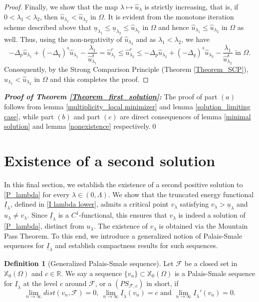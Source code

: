 \documentclass[reqno,oneside]{amsart}
\theoremstyle{definition}
\newtheorem{definition}[theorem]{Definition}
\theoremstyle{remark}
\numberwithin{equation}{section}
\newcommand{\Om} {\Omega}
\newcommand{\sr}{\mathbb{R}}
\newcommand{\p}{\Delta_p}
\newcommand{\qs}{(-\Delta_q)^s}
\newcommand{\rar}{\rightarrow}
\newcommand{\xo}{\mathbb{X}_0}
\newcommand{\ul}{\underline{u}}
\newcommand{\ti}{\underline{I}_{\la}}
\newcommand{\il}{\underline{I}}
\newcommand{\la} {\lambda}
\begin{document}
\begin{proof}
    Finally, we show that the map $\la \mapsto \hat{u}_{\la}$ is strictly increasing, that is, if $0<\la_1 < \la_2$, then $\hat{u}_{\la_1} < \hat{u}_{\la_2}$ in $\Om$. It is evident from the monotone iteration scheme described above that $\ul_{\la_1} \leq \ul_{\la_2} \leq \hat{u}_{\la_2}$ in $\Om$ and hence $\hat{u}_{\la_1} \leq \hat{u}_{\la_2}$ in $\Om$ as well. Thus, using the non-negativity of $\hat{u}_{\la_2}$ and as $\la_1 < \la_2$, we have
    \[-\p \hat{u}_{\la_1} + \qs \hat{u}_{\la_1} - \frac{\la_1}{\hat{u}_{\la_1}^{\delta}} = \hat{u}_{\la_1}^r \leq \hat{u}_{\la_2}^r \leq -\p \hat{u}_{\la_2} + \qs \hat{u}_{\la_2} - \frac{\la_1}{\hat{u}_{\la_2}^{\delta}} \text{ in } \Om.\]
    Consequently, by the Strong Comparison Principle (Theorem \ref{Theorem_SCP}), $\hat{u}_{\la_1} < \hat{u}_{\la_2}$ in $\Om$ and this completes the proof.
\end{proof}

\noindent\textbf{\textit{Proof of Theorem \ref{Theorem_first_solution}:}} The proof of part $(a)$ follows from lemma \ref{multiplicity_local minimizer} and lemma \ref{solution_limiting case}, while part $(b)$ and part $(c)$ are direct consequences of lemma \ref{minimal solution} and lemma \ref{nonexistence} respectively.\hfill\qed


\section{Existence of a second solution}\label{section_second_solution}

In this final section, we establish the existence of a second positive solution to \eqref{P_lambda} for every $\la \in (0, \Lambda)$. We show that the truncated energy functional $\underline{I}_{\la}$, defined in \eqref{I lambda lower}, admits a critical point $v_{\la}$ satisfying $v_{\la} > \underline{u}_{\la}$ and $u_{\la} \not= v_{\la}$. Since $\underline{I}_{\la}$ is a $C^1$-functional, this ensures that $v_{\la}$ is indeed a solution of \eqref{P_lambda}, distinct from $u_{\la}$. The existence of $v_{\la}$ is obtained via the Mountain Pass Theorem. To this end, we introduce a generalized notion of Palais-Smale sequences for $\il_{\la}$ and establish compactness results for such sequences.

\begin{definition}[Generalized Palais-Smale sequence]
    Let $\mathcal{F}$ be a closed set in $\xo(\Om)$ and $c\in\sr$. We say a sequence $\{v_n\} \subset \xo(\Om)$ is a Palais-Smale sequence for $\ti$ at the level $c$ around $\mathcal{F}$, or a $(PS_{\mathcal{F}, c})$ in short, if
    \[ \lim_{n\rar\infty} dist (v_n, \mathcal{F}) =0,\ \lim_{n\rar\infty} \ti (v_n) = c \text{ and } \lim_{n\rar\infty} \ti' (v_n) =0. \]
\end{definition}
\end{document}
